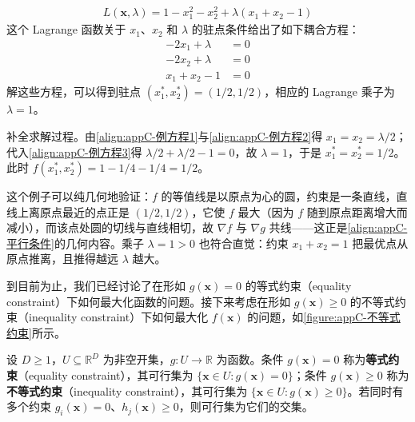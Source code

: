 \documentclass[../main.tex]{subfiles}
\begin{document}
\begin{example}[ 二次函数的约束驻点]\label{example:appC-二次约束驻点}
\begin{align}
  L(\bm{x},\lambda)=1-x_1^{2}-x_2^{2}+\lambda(x_1+x_2-1)
  \label{align:appC-例Lagrange}
\end{align}
这个 Lagrange 函数关于 $x_1$、$x_2$ 和 $\lambda$ 的驻点条件给出了如下耦合方程：
\begin{align}
  -2x_1+\lambda&=0
  \label{align:appC-例方程1}\\
  -2x_2+\lambda&=0
  \label{align:appC-例方程2}\\
  x_1+x_2-1&=0
  \label{align:appC-例方程3}
\end{align}
解这些方程，可以得到驻点 $(x_1^{*},x_2^{*})=(1/2,1/2)$，相应的 Lagrange 乘子为 $\lambda=1$。
\end{example}

\begin{solution}
补全求解过程。由\eqref{align:appC-例方程1}与\eqref{align:appC-例方程2}得 $x_1=x_2=\lambda/2$；代入\eqref{align:appC-例方程3}得 $\lambda/2+\lambda/2-1=0$，故 $\lambda=1$，于是 $x_1^{*}=x_2^{*}=1/2$。此时 $f(x_1^{*},x_2^{*})=1-1/4-1/4=1/2$。

\end{solution}

\begin{remark}
这个例子可以纯几何地验证：$f$ 的等值线是以原点为心的圆，约束是一条直线，直线上离原点最近的点正是 $(1/2,1/2)$，它使 $f$ 最大（因为 $f$ 随到原点距离增大而减小），而该点处圆的切线与直线相切，故 $\nabla f$ 与 $\nabla g$ 共线——这正是\eqref{align:appC-平行条件}的几何内容。乘子 $\lambda=1>0$ 也符合直觉：约束 $x_1+x_2=1$ 把最优点从原点推离，且推得越远 $\lambda$ 越大。
\end{remark}

到目前为止，我们已经讨论了在形如 $g(\bm{x})=0$ 的等式约束（equality constraint）下如何最大化函数的问题。接下来考虑在形如 $g(\bm{x})\geqslant0$ 的不等式约束（inequality constraint）下如何最大化 $f(\bm{x})$ 的问题，如\cref{figure:appC-不等式约束}所示。

\begin{definition}[等式约束与不等式约束]\label{definition:appC-等式不等式约束}
设 $D\geqslant1$，$U\subseteq\mathbb{R}^{D}$ 为非空开集，$g:U\to\mathbb{R}$ 为函数。条件 $g(\bm{x})=0$ 称为\textbf{等式约束}（equality constraint），其可行集为 $\{\bm{x}\in U:g(\bm{x})=0\}$；条件 $g(\bm{x})\geqslant0$ 称为\textbf{不等式约束}（inequality constraint），其可行集为 $\{\bm{x}\in U:g(\bm{x})\geqslant0\}$。若同时有多个约束 $g_{i}(\bm{x})=0$、$h_{j}(\bm{x})\geqslant0$，则可行集为它们的交集。
\end{definition}
\end{document}
